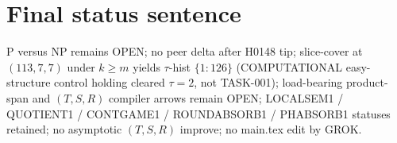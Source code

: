 \documentclass[11pt]{article}
\begin{document}
\section*{Final status sentence}
P versus NP remains OPEN; no peer delta after H0148 tip; slice-cover at $(113,7,7)$ under
$k{\ge}m$ yields $\tau$-hist $\{1{:}126\}$ (COMPUTATIONAL easy-structure control holding
cleared $\tau{=}2$, not TASK-001); load-bearing product-span and $(T,S,R)$ compiler arrows
remain OPEN; LOCALSEM1 / QUOTIENT1 / CONTGAME1 / ROUNDABSORB1 / PHABSORB1 statuses retained;
no asymptotic $(T,S,R)$ improve; no main.tex edit by GROK.
\end{document}
